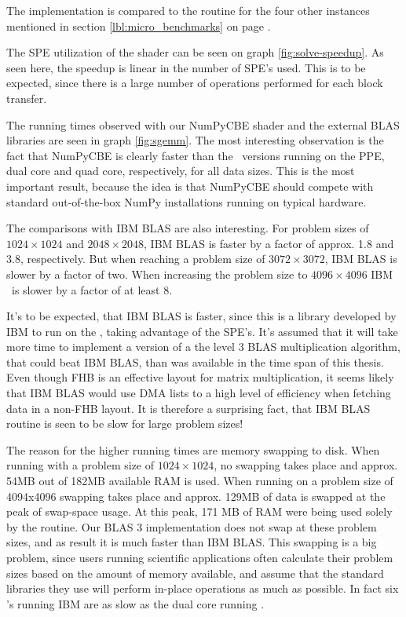 The implementation is compared to the  routine for the
four other instances mentioned in section \ref{lbl:micro_benchmarks}
on page \pageref{lbl:micro_benchmarks}.

The SPE utilization of the shader can be seen on
graph \ref{fig:solve-speedup}. As seen here, the speedup is linear in
the number of SPE's used. This is to be expected, since there is a
large number of operations performed for each block transfer.

The running times observed with our NumPyCBE shader and the external
BLAS libraries are seen in graph
\ref{fig:sgemm}. The most interesting observation is the fact that NumPyCBE is clearly faster than
the \ATLAS\ versions running on the PPE, dual core and quad
core, respectively, for all data sizes. This is the most important
result, because the idea is that NumPyCBE should compete with
standard out-of-the-box NumPy installations running on typical
hardware.

The comparisons with IBM BLAS are also interesting. For problem sizes
of $1024 \times 1024$ and $2048 \times 2048$, IBM BLAS is faster by a
factor of approx. 1.8 and 3.8, respectively. But when reaching a
problem size of $3072 \times 3072$, IBM BLAS is slower by a factor of
two. When increasing the problem size to $4096 \times 4096$
IBM \BLAS\ is slower by a factor of at least 8.

It's to be expected, that IBM BLAS is faster, since this is a library
developed by IBM to run on the \CBE{}, taking advantage of the
SPE's. It's assumed that it will take more time to implement a version
of a the level 3 BLAS multiplication algorithm, that could beat IBM
BLAS, than was available in the time span of this thesis. Even though
FHB is an effective layout for matrix multiplication, it seems likely
that IBM BLAS would use DMA lists to a high level of efficiency when
fetching data in a non-FHB layout. It is therefore a surprising fact,
that IBM BLAS  routine is seen to be slow for large
problem sizes!

The reason for the higher running times are memory swapping to
disk. When running with a problem size of $1024 \times 1024$, no
swapping takes place and approx. 54MB out of 182MB available RAM is
used. When running on a problem size of 4094x4096 swapping takes place
and approx. 129MB of data is swapped at the peak of swap-space
usage. At this peak, 171 MB of RAM were being used solely by
the  routine. Our BLAS 3 implementation does not swap
at these problem sizes, and as result it is much faster than IBM
BLAS. This swapping is a big problem, since users running scientific
applications often calculate their problem sizes based on the amount
of memory available, and assume that the standard libraries they use
will perform in-place operations as much as possible. In fact
six \SPE{}'s running IBM  are as slow as the dual core
running \ATLAS{}.

